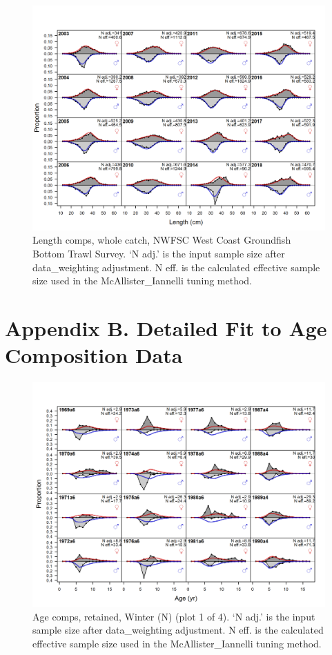 \documentclass[12pt,]{article}
\begin{document}
\begin{figure}
\centering
\includegraphics{r4ss/plots_mod1/comp_lenfit_flt7mkt0.png}
\caption{Length comps, whole catch, NWFSC West Coast Groundfish Bottom
Trawl Survey. `N adj.' is the input sample size after data\_weighting
adjustment. N eff. is the calculated effective sample size used in the
McAllister\_Iannelli tuning method. \label{fig:length_fits}}
\end{figure}

\FloatBarrier

\section{Appendix B. Detailed Fit to Age Composition
Data}\label{appendix-b.-detailed-fit-to-age-composition-data}

\begin{figure}
\centering
\includegraphics{r4ss/plots_mod1/comp_agefit_flt1mkt2_page1.png}
\caption{Age comps, retained, Winter (N) (plot 1 of 4). `N adj.' is the
input sample size after data\_weighting adjustment. N eff. is the
calculated effective sample size used in the McAllister\_Iannelli tuning
method. \label{fig:age_fits}}
\end{figure}
\end{document}
